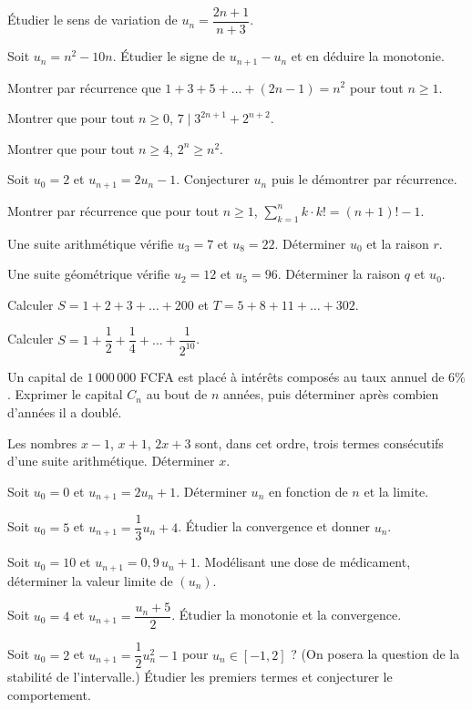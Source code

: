 \exo{} Étudier le sens de variation de $u_n=\dfrac{2n+1}{n+3}$.

\exo{} Soit $u_n=n^2-10n$. Étudier le signe de $u_{n+1}-u_n$ et en déduire la monotonie.

\exo{} Montrer par récurrence que $1+3+5+\dots+(2n-1)=n^2$ pour tout $n\ge1$.

\exo{} Montrer que pour tout $n\ge0$, $7\mid 3^{2n+1}+2^{n+2}$.

\exo{} Montrer que pour tout $n\ge4$, $2^n\ge n^2$.

\exo{} Soit $u_0=2$ et $u_{n+1}=2u_n-1$. Conjecturer $u_n$ puis le démontrer par récurrence.

\exo{} Montrer par récurrence que pour tout $n\ge1$, $\displaystyle\sum_{k=1}^{n}k\cdot k!=(n+1)!-1$.

\exo{} Une suite arithmétique vérifie $u_3=7$ et $u_8=22$. Déterminer $u_0$ et la raison $r$.

\exo{} Une suite géométrique vérifie $u_2=12$ et $u_5=96$. Déterminer la raison $q$ et $u_0$.

\exo{} Calculer $S=1+2+3+\dots+200$ et $T=5+8+11+\dots+302$.

\exo{} Calculer $S=1+\dfrac12+\dfrac14+\dots+\dfrac1{2^{10}}$.

\exo{} Un capital de $1\,000\,000$ FCFA est placé à intérêts composés au taux annuel de $6\%$.
Exprimer le capital $C_n$ au bout de $n$ années, puis déterminer après combien d'années il a doublé.

\exo{} Les nombres $x-1$, $x+1$, $2x+3$ sont, dans cet ordre, trois termes consécutifs
d'une suite arithmétique. Déterminer $x$.

\exo{} Soit $u_0=0$ et $u_{n+1}=2u_n+1$. Déterminer $u_n$ en fonction de $n$ et la limite.

\exo{} Soit $u_0=5$ et $u_{n+1}=\dfrac13 u_n+4$. Étudier la convergence et donner $u_n$.

\exo{} Soit $u_0=10$ et $u_{n+1}=0{,}9\,u_n+1$. Modélisant une dose de médicament,
déterminer la valeur limite de $(u_n)$.

\exo{} Soit $u_0=4$ et $u_{n+1}=\dfrac{u_n+5}{2}$. Étudier la monotonie et la convergence.

\exo{} Soit $u_0=2$ et $u_{n+1}=\dfrac{1}{2}u_n^2-1$ pour $u_n\in[-1,2]$ ? (On posera la
question de la stabilité de l'intervalle.) Étudier les premiers termes et conjecturer le comportement.


